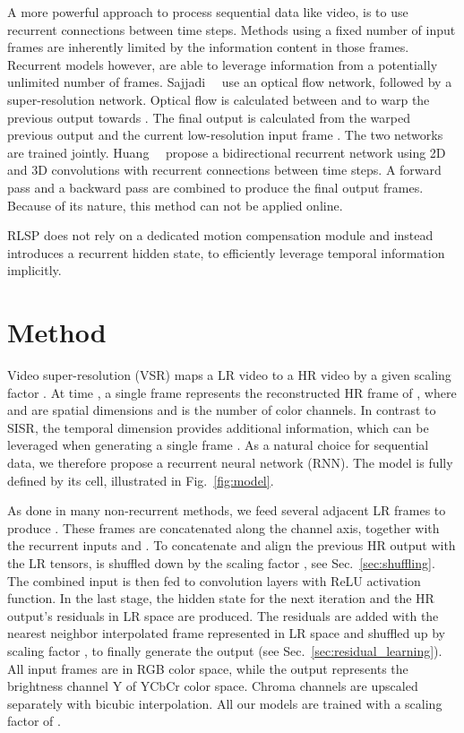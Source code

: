 \documentclass[10pt,twocolumn,letterpaper]{article}
\begin{document}
A more powerful approach to process sequential data like video, is to use recurrent connections between time steps. Methods using a fixed number of input frames are inherently limited by the information content in those frames. Recurrent models however, are able to leverage information from a potentially unlimited number of frames.
Sajjadi~\etal~\cite{frvsr} use an optical flow network, followed by a super-resolution network. Optical flow is calculated between  and  to warp the previous output  towards . The final output  is calculated from the warped previous output and the current low-resolution input frame . The two networks are trained jointly.
Huang~\etal~\cite{brcn} propose a bidirectional recurrent network using 2D and 3D convolutions with recurrent connections between time steps. A forward pass and a backward pass are combined to produce the final output frames. Because of its nature, this method can not be applied online.

RLSP does not rely on a dedicated motion compensation module and instead introduces a recurrent hidden state, to efficiently leverage temporal information implicitly.


\section{Method}
Video super-resolution (VSR) maps a LR video  to a HR video  by a given scaling factor . At time , a single frame  represents the reconstructed HR frame of , where  and  are spatial dimensions and  is the number of color channels.
In contrast to SISR, the temporal dimension provides additional information, which can be leveraged when generating a single frame . As a natural choice for sequential data, we therefore propose a recurrent neural network (RNN). The model is fully defined by its cell, illustrated in Fig.~\ref{fig:model}. 

As done in many non-recurrent methods, we feed several adjacent LR frames  to produce . These frames are concatenated along the channel axis, together with the recurrent inputs  and . To concatenate and align the previous HR output  with the LR tensors,  is shuffled down by the scaling factor , see Sec.~\ref{sec:shuffling}. The combined input is then fed to  convolution layers with ReLU activation function. In the last stage, the hidden state  for the next iteration and the HR output's residuals in LR space are produced. The residuals are added with the nearest neighbor interpolated frame  represented in LR space and shuffled up by scaling factor , to finally generate the output  (see Sec.~\ref{sec:residual_learning}). All input frames are in RGB color space, while the output represents the brightness channel Y of YCbCr color space. Chroma channels are upscaled separately with bicubic interpolation. All our models are trained with a scaling factor of .
\end{document}
